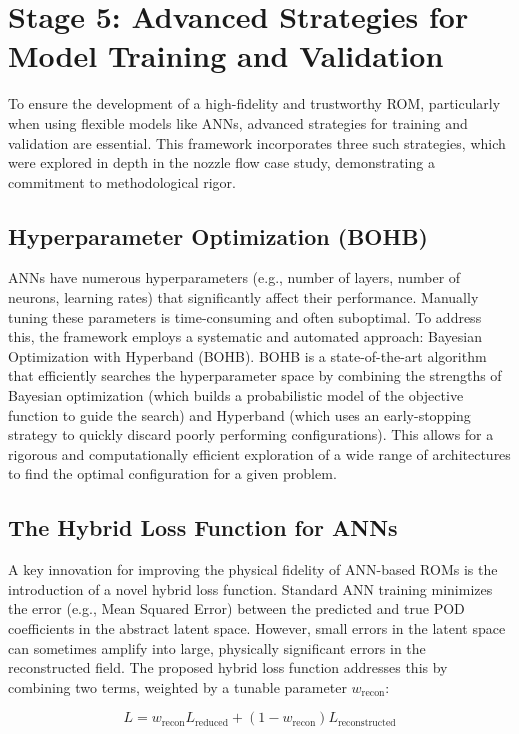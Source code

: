 \documentclass[dsc, EN]{ufabcFHZh}
\begin{document}
{\section{Stage 5: Advanced Strategies for Model Training and Validation}

To ensure the development of a high-fidelity and trustworthy ROM, particularly when using flexible models like ANNs, advanced strategies for training and validation are essential. This framework incorporates three such strategies, which were explored in depth in the nozzle flow case study, demonstrating a commitment to methodological rigor.

\subsection{Hyperparameter Optimization (BOHB)}


ANNs have numerous hyperparameters (e.g., number of layers, number of neurons, learning rates) that significantly affect their performance. Manually tuning these parameters is time-consuming and often suboptimal. To address this, the framework employs a systematic and automated approach: Bayesian Optimization with Hyperband (BOHB). BOHB is a state-of-the-art algorithm that efficiently searches the hyperparameter space by combining the strengths of Bayesian optimization (which builds a probabilistic model of the objective function to guide the search) and Hyperband (which uses an early-stopping strategy to quickly discard poorly performing configurations). This allows for a rigorous and computationally efficient exploration of a wide range of architectures to find the optimal configuration for a given problem.


\subsection{ The Hybrid Loss Function for ANNs}

A key innovation for improving the physical fidelity of ANN-based ROMs is the introduction of a novel hybrid loss function. Standard ANN training minimizes the error (e.g., Mean Squared Error) between the predicted and true POD coefficients in the abstract latent space. However, small errors in the latent space can sometimes amplify into large, physically significant errors in the reconstructed field. The proposed hybrid loss function addresses this by combining two terms, weighted by a tunable parameter $w_{\text{recon}}$:


$$L = w_{\text{recon}} L_{\text{reduced}} + (1 - w_{\text{recon}}) L_{\text{reconstructed}}$$

}
\end{document}
